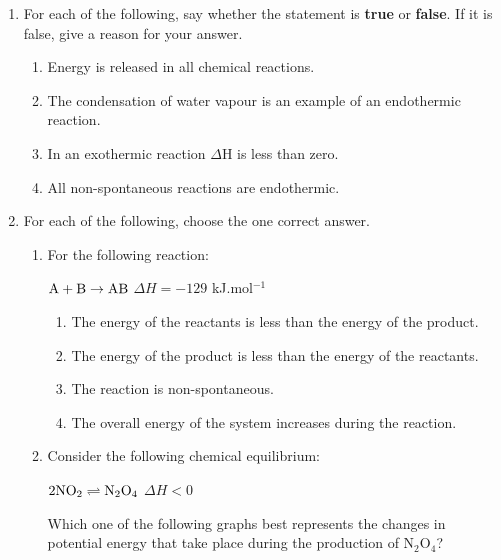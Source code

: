 \begin{eocexercises}{}

\begin{enumerate}
\item{For each of the following, say whether the statement is \textbf{true} or \textbf{false}. If it is false, give a reason for your answer.
\begin{enumerate}
\item{Energy is released in all chemical reactions.}
\item{The condensation of water vapour is an example of an endothermic reaction.}
\item{In an exothermic reaction $\Delta$H is less than zero.}
\item{All non-spontaneous reactions are endothermic.}
\end{enumerate}
}

\item{For each of the following, choose the one correct answer.}

\begin{enumerate}
\item{For the following reaction:

\begin{center}
$\rm{A + B \rightarrow AB}$ $\Delta H = -129$ kJ.mol$^{-1}$
\end{center}
}
\begin{enumerate}
\item{The energy of the reactants is less than the energy of the product.}
\item{The energy of the product is less than the energy of the reactants.}
\item{The reaction is non-spontaneous.}
\item{The overall energy of the system increases during the reaction.}
\end{enumerate}


\item{Consider the following chemical equilibrium:

\begin{center}
$\rm{2NO_{2} \rightleftharpoons N_{2}O_{4}}$  $\Delta H < 0$
\end{center}

Which one of the following graphs best represents the changes in potential energy that take place during the production of N$_{2}$O$_{4}$?}\\


\end{enumerate}
\end{enumerate}
\end{eocexercises}
